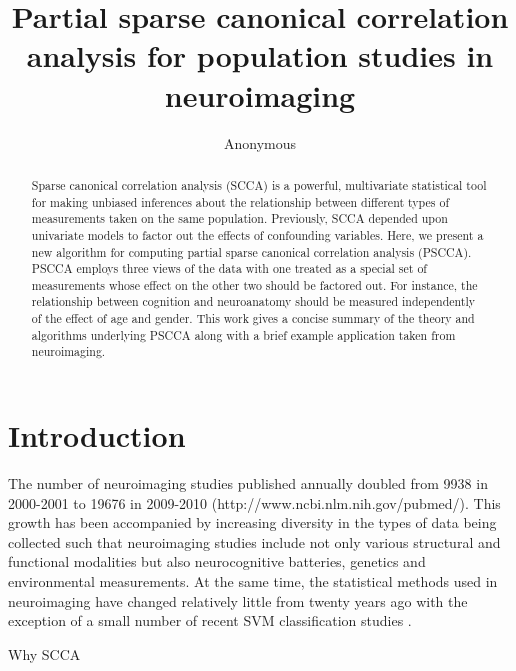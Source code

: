 \documentclass{llncs}
\begin{document}
\vspace{-0.1in}
\title{Partial sparse canonical correlation analysis for population
  studies in neuroimaging}
\author{Anonymous}
\maketitle              
\begin{abstract}
Sparse canonical correlation analysis (SCCA) is a powerful,
multivariate statistical tool for making unbiased inferences about the
relationship between different types of measurements taken on the same
population.  Previously, SCCA depended upon univariate models to
factor out the effects of confounding variables.  Here, we present a
new algorithm for computing partial sparse canonical correlation
analysis (PSCCA).  PSCCA employs three views of the data with one
treated as a special set of measurements whose effect on the other two
should be factored out.  For instance, the relationship between
cognition and neuroanatomy should be measured independently of the
effect of age and gender.  This work gives a concise summary of the
theory and algorithms underlying PSCCA along with a brief example
application taken from neuroimaging.
\end{abstract}
\section{Introduction}
The number of neuroimaging studies published annually doubled from
9938 in 2000-2001 to 19676 in 2009-2010
(http://www.ncbi.nlm.nih.gov/pubmed/).  This growth has been
accompanied by increasing diversity in the types of data being
collected such that neuroimaging studies include not only various
structural and functional modalities but also neurocognitive
batteries, genetics and environmental measurements.  At the same
time, the statistical methods used in neuroimaging have changed
relatively little from twenty years ago with the exception of a small
number of recent SVM classification studies \cite{}.

Why SCCA
\end{document}
